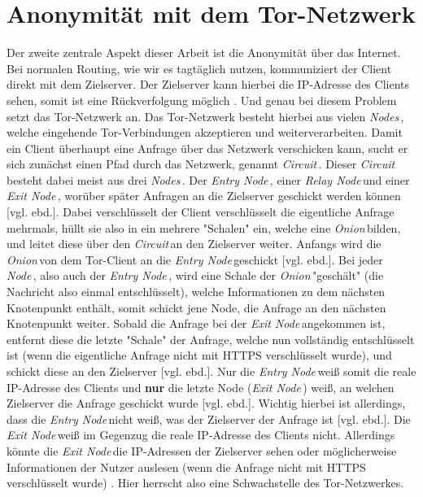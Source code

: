 \documentclass[a4paper,ngerman, headheight=28pt,12pt]{scrartcl}
\newcommand{\vcite}[1]{\cite[vgl.][]{#1}}
\newcommand{\vebd}{[vgl. ebd.]}
\newcommand{\entryn}{\textit{Entry Node\,}}
\newcommand{\relayn}{\textit{Relay Node\,}}
\newcommand{\exitn}{\textit{Exit Node\,}}
\newcommand{\nodes}{\textit{Nodes\,}}
\newcommand{\node}{\textit{Node\,}}
\newcommand{\onion}{\textit{Onion\,}}
\newcommand{\circuit}{\textit{Circuit\,}}
\begin{document}
\section{Anonymität mit dem Tor-Netzwerk}
Der zweite zentrale Aspekt dieser Arbeit ist die Anonymität über das Internet.
Bei normalen Routing, wie wir es tagtäglich nutzen, kommuniziert der Client direkt mit dem Zielserver. Der Zielserver kann hierbei die IP-Adresse des Clients sehen, somit ist eine Rückverfolgung möglich \vcite{LocPolice,TCP_IP}. Und genau bei diesem Problem setzt das Tor-Netzwerk an. Das Tor-Netzwerk besteht hierbei aus vielen \nodes, welche eingehende Tor-Verbindungen akzeptieren und weiterverarbeiten. Damit ein Client überhaupt eine Anfrage über das Netzwerk verschicken kann, sucht er sich zunächst einen Pfad durch das Netzwerk, genannt \circuit \vcite{TorCircuits}. Dieser \circuit besteht dabei meist aus drei \nodes. Der \entryn, einer \relayn und einer \exitn, worüber später Anfragen an die Zielserver geschickt werden können \vebd.
Dabei verschlüsselt der Client verschlüsselt die eigentliche Anfrage mehrmals, hüllt sie also in ein mehrere "Schalen" ein, welche eine \onion bilden, und leitet diese über den \circuit an den Zielserver weiter\vcite{TorDesign}. Anfangs wird die \onion von dem Tor-Client an die \entryn geschickt \vebd. Bei jeder \node, also auch der \entryn, wird eine Schale der \onion "geschält" (die Nachricht also einmal entschlüsselt), welche Informationen zu dem nächsten Knotenpunkt enthält, somit schickt jene Node, die Anfrage an den nächsten Knotenpunkt weiter\vcite{TorStructure2}.
Sobald die Anfrage bei der \exitn angekommen ist, entfernt diese die letzte "Schale" der Anfrage, welche nun vollständig entschlüsselt ist (wenn die eigentliche Anfrage nicht mit HTTPS verschlüsselt wurde), und schickt diese an den Zielserver \vebd. Nur die \entryn weiß somit die reale IP-Adresse des Clients und \textbf{nur} die letzte Node (\exitn) weiß, an welchen Zielserver die Anfrage geschickt wurde \vebd. Wichtig hierbei ist allerdings, dass die \entryn nicht weiß, was der Zielserver der Anfrage ist \vebd. Die \exitn weiß im Gegenzug die reale IP-Adresse des Clients nicht. Allerdings könnte die \exitn die IP-Adressen der Zielserver sehen oder möglicherweise Informationen der Nutzer auslesen (wenn die Anfrage nicht mit HTTPS verschlüsselt wurde) \vcite{TorExitNodeVulnerability}. Hier herrscht also eine Schwachstelle des Tor-Netzwerkes.
\end{document}
